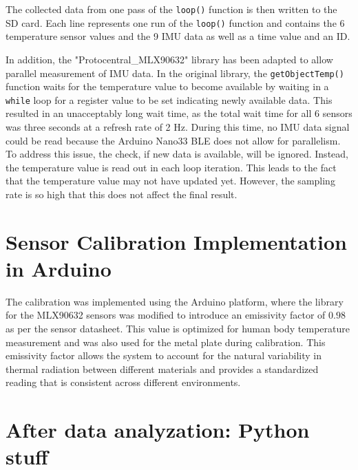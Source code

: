 The collected data from one pass of the \texttt{loop()} function is then written to the SD card. Each line represents one run of the \texttt{loop()} function and contains the 6 temperature sensor values and the 9 IMU data as well as a time value and an ID.

In addition, the "Protocentral\_MLX90632" library has been adapted to allow parallel measurement of IMU data. In the original library, the \texttt{getObjectTemp()} function waits for the temperature value to become available by waiting in a \texttt{while} loop for a register value to be set indicating newly available data. This resulted in an unacceptably long wait time, as the total wait time for all 6 sensors was three seconds at a refresh rate of 2 Hz. During this time, no IMU data signal could be read because the Arduino Nano33 BLE does not allow for parallelism. To address this issue, the check, if new data is available, will be ignored. 
Instead, the temperature value is read out in each loop iteration. 
This leads to the fact that the temperature value may not have updated yet. 
However, the sampling rate is so high that this does not affect the final result.

\section{Sensor Calibration Implementation in Arduino}
The calibration was implemented using the Arduino platform, where the library for the MLX90632 sensors was modified to introduce an emissivity factor of $0.98$ as per the sensor datasheet. This value is optimized for human body temperature measurement and was also used for the metal plate during calibration. This emissivity factor allows the system to account for the natural variability in thermal radiation between different materials and provides a standardized reading that is consistent across different environments.

\section{After data analyzation: Python stuff}